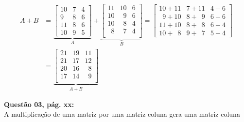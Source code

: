 \documentclass[a4paper,12pt]{article}
\begin{document}
    \begin{align*}
        A + B &=
            \underbrace{
            \begin{bmatrix}
                10 & 7 & 4\\
                9  & 8 & 6\\
                11 & 8 & 6\\
                10 & 9 & 5
            \end{bmatrix}}_{A} +
            \underbrace{
            \begin{bmatrix}
                11 & 10 & 6\\
                10 & \phantom{2}9  & 6\\
                10 & \phantom{2}8  & 4\\
                \phantom{2}8  & \phantom{2}7  & 4\\
            \end{bmatrix}}_{B} 
        =
        \begin{bmatrix}
                10+11 & 7+11 & 4+6\\
                 \phantom{2}9+10  & 8+\phantom{2}9 & 6+6\\
                11+10 & 8+\phantom{2}8 & 6+4\\
                10+\phantom{2}8 & 9+\phantom{2}7 & 5+4
        \end{bmatrix}\\
        & =
        \underbrace{\begin{bmatrix}
            21 & 19 & 11\\
            21 & 17 & 12\\
            20 & 16 & \phantom{2}8\\
            17 & 14 & \phantom{2}9\\
        \end{bmatrix}}_{A + B}
    \end{align*}

\textbf{Questão 03, pág. xx:}\\

A multiplicação de uma matriz por uma matriz coluna gera uma matriz coluna
\end{document}
